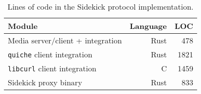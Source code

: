 \begin{table}[ht]
  \centering
  \begin{tabular}{l r r}
    \hline
    \textbf{Module} & \textbf{Language} & \textbf{LOC} \\
    \hline
    Media server/client + integration & Rust & 478 \\
    \texttt{quiche} client integration & Rust & 1821 \\
    \texttt{libcurl} client integration & C & 1459 \\
    Sidekick proxy binary & Rust & 833 \\
    \hline
  \end{tabular}
  \caption{Lines of code in the Sidekick protocol implementation.
  }
  \label{tab:sidekick:lines-of-code}
\end{table}
